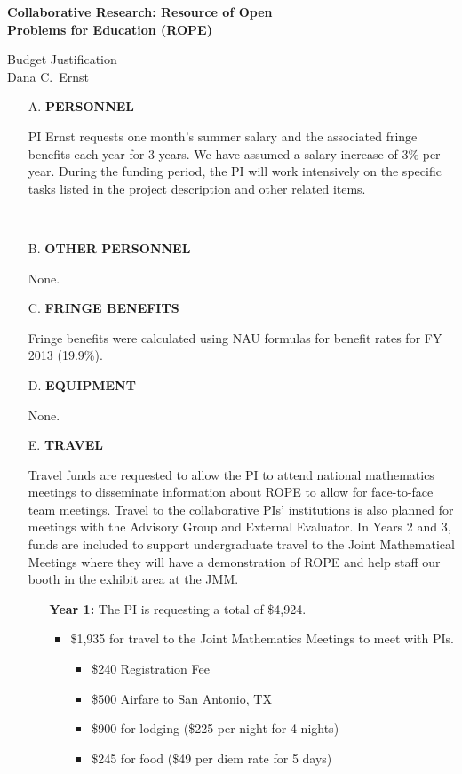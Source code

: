 \documentclass[11pt]{article}
\begin{document}
\begin{center}
{\Large \textbf{Collaborative Research: Resource of Open\\
Problems for Education (ROPE)}}

\bigskip

{\Large Budget Justification}\\
\smallskip
Dana C.~Ernst
\end{center}

\begin{enumerate}[leftmargin=*]

\item[A.] \textbf{PERSONNEL}

PI Ernst requests one month's summer salary and the associated fringe benefits each year for 3 years. We have assumed a salary increase of 3\% per year.  During the funding period, the PI will work intensively on the specific tasks listed in the project description and other related items. 

\ \hfill {}

\item[B.] \textbf{OTHER PERSONNEL}

None. \hfill {}

\item[C.] \textbf{FRINGE BENEFITS}

Fringe benefits were calculated using NAU formulas for benefit rates for FY 2013 (19.9\%).

\hfill {}

\item[D.] \textbf{EQUIPMENT}

None. \hfill {}

\item[E.] \textbf{TRAVEL}

Travel funds are requested to allow the PI to attend national mathematics meetings to disseminate information about ROPE to allow for face-to-face team meetings.  Travel to the collaborative PIs' institutions is also planned for meetings with the Advisory Group and External Evaluator. In Years 2 and 3, funds are included to support undergraduate travel to the Joint Mathematical Meetings where they will have a demonstration of ROPE and help staff our booth in the exhibit area at the JMM.

\begin{enumerate}
\item[] \textbf{Year 1:} The PI is requesting a total of \$4,924.
\begin{itemize}
\item \$1,935 for travel to the Joint Mathematics Meetings to meet with PIs.
\begin{itemize}
\item \$240 Registration Fee
\item \$500 Airfare to San Antonio, TX
\item \$900 for lodging (\$225 per night for 4 nights)
\item \$245 for food (\$49 per diem rate for 5 days)
\end{itemize}


\end{itemize}
\end{enumerate}
\end{enumerate}
\end{document}
